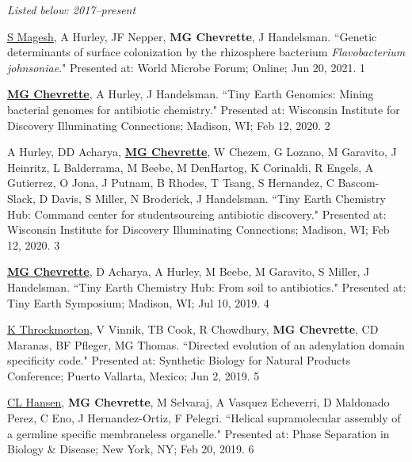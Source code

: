 
 \vspace{-2mm}

\begin{cvpubs}

\cvpub
{\hspace{-1cm} \textit{Listed below: 2017--present}}
{}

\cvpub
{\underline{S Magesh}, A Hurley, JF Nepper, \textbf{MG Chevrette}, J Handelsman. ``Genetic determinants of surface colonization by the rhizosphere bacterium \textit{Flavobacterium johnsoniae}." Presented at: World Microbe Forum; Online; Jun 20, 2021.}
{1}

\cvpub
{\underline{\textbf{MG Chevrette}}, A Hurley, J Handelsman. ``Tiny Earth Genomics: Mining bacterial genomes for antibiotic chemistry." Presented at: Wisconsin Institute for Discovery Illuminating Connections; Madison, WI; Feb 12, 2020.}
{2}

\cvpub
{A Hurley, DD Acharya, \underline{\textbf{MG Chevrette}}, W Chezem, G Lozano, M Garavito, J Heinritz, L Balderrama, M Beebe, M DenHartog, K Corinaldi, R Engels, A Gutierrez, O Jona, J Putnam, B Rhodes, T Tsang, S Hernandez, C Bascom-Slack, D Davis, S Miller, N Broderick, J Handelsman. ``Tiny Earth Chemistry Hub: Command center for studentsourcing antibiotic discovery." Presented at: Wisconsin Institute for Discovery Illuminating Connections; Madison, WI; Feb 12, 2020.}
{3}

\cvpub
{\underline{\textbf{MG Chevrette}}, D Acharya, A Hurley, M Beebe, M Garavito, S Miller, J Handelsman. ``Tiny Earth Chemistry Hub: From soil to antibiotics." Presented at: Tiny Earth Symposium; Madison, WI; Jul 10, 2019.}
{4}

\cvpub
{\underline{K Throckmorton}, V Vinnik, TB Cook, R Chowdhury, \textbf{MG Chevrette}, CD Maranas, BF Pfleger, MG Thomas. ``Directed evolution of an adenylation domain specificity code." Presented at: Synthetic Biology for Natural Products Conference; Puerto Vallarta, Mexico; Jun 2, 2019.}
{5}

\end{cvpubs} \begin{cvpubs}

\cvpub
{\underline{CL Hansen}, \textbf{MG Chevrette}, M Selvaraj, A Vasquez Echeverri, D Maldonado Perez, C Eno, J Hernandez-Ortiz, F Pelegri. ``Helical supramolecular assembly of a germline specific membraneless organelle." Presented at: Phase Separation in Biology \& Disease; New York, NY; Feb 20, 2019.}
{6}


\end{cvpubs}
